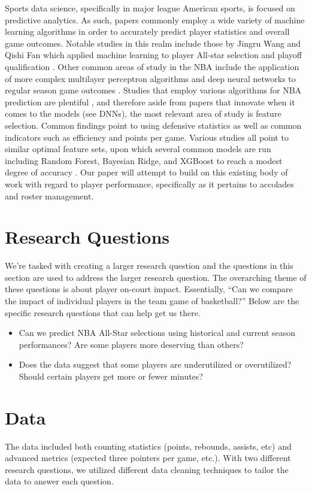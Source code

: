 \documentclass[12pt]{article}
\begin{document}
Sports data science, specifically in major league American sports, is focused on predictive analytics. As such, papers commonly employ a wide variety of machine learning algorithms in order to accurately predict player statistics and overall game outcomes. Notable studies in this realm include those by Jingru Wang and Qishi Fan which applied machine learning to player All-star selection and playoff qualification \cite{wang2021}. Other common areas of study in the NBA include the application of more complex multilayer perceptron algorithms and deep neural networks to regular season game outcomes \cite{georgievski2021}. Studies that employ various algorithms for NBA prediction are plentiful \cite{wang2023}, and therefore aside from papers that innovate when it comes to the models (see DNNs), the most relevant area of study is feature selection. Common findings point to using defensive statistics as well as common indicators such as efficiency and points per game. Various studies all point to similar optimal feature sets, upon which several common models are run including Random Forest, Bayesian Ridge, and XGBoost to reach a modest degree of accuracy \cite{alonso2024}. Our paper will attempt to build on this existing body of work with regard to player performance, specifically as it pertains to accolades and roster management.  

\section{Research Questions}

We’re tasked with creating a larger research question and the questions in this section are used to address the larger research question. The overarching theme of these questions is about player on-court impact. Essentially, “Can we compare the impact of individual players in the team game of basketball?” Below are the specific research questions that can help get us there. 

\begin{itemize}
    \item Can we predict NBA All-Star selections using historical and current season performances? Are some players more deserving than others?
    \item Does the data suggest that some players are underutilized or overutilized? Should certain players get more or fewer minutes?
\end{itemize}

\section{Data}
The data included both counting statistics (points, rebounds, assists, etc) and advanced metrics (expected three pointers per game, etc.). With two different research questions, we utilized different data cleaning techniques to tailor the data to answer each question.
\end{document}
